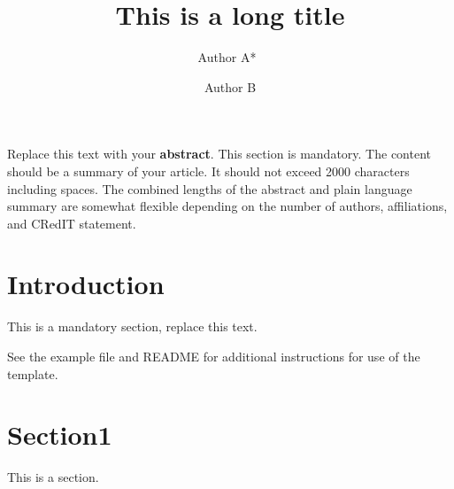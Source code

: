 \documentclass[proof]{sedimentologika}
\title{This is a long title} %
\author[1,2]{Author A*~\orcidlink{0000-0002-2771-9344}}
\author[1]{Author B}
\affil[1]{Affiliation 1}
\affil[2]{Affiliation 2}
\begin{document}

{%
  Replace this text with your \textbf{abstract}.
  This section is mandatory.
  The content should be a summary of your article.
  It should not exceed 2000 characters including spaces.
  The combined lengths of the abstract and plain language summary are somewhat flexible depending on the number of authors, affiliations, and CRedIT statement.
}
{%
}


\section{Introduction}
This is a mandatory section, replace this text.

See the example file and README for additional instructions for use of the template.

\section{Section1}
This is a section.
\end{document}
